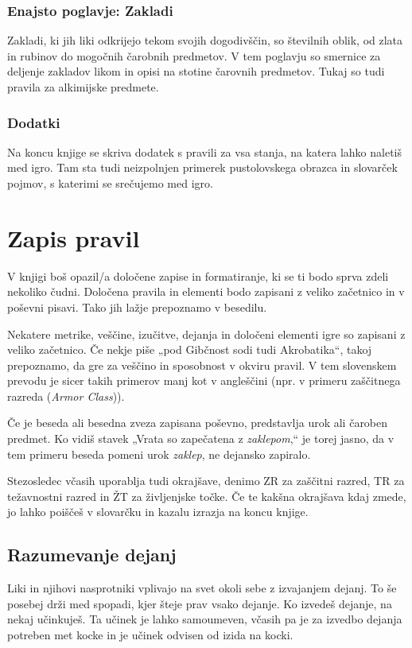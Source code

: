 \subsubsection{Enajsto poglavje: Zakladi}
Zakladi, ki jih liki odkrijejo tekom svojih dogodivščin, so številnih oblik, od zlata in rubinov do mogočnih čarobnih predmetov. V tem poglavju so smernice za deljenje zakladov likom in opisi na stotine čarovnih predmetov. Tukaj so tudi pravila za alkimijske predmete.

\subsubsection{Dodatki}
Na koncu knjige se skriva dodatek s pravili za vsa stanja, na katera lahko naletiš med igro. Tam sta tudi neizpolnjen primerek pustolovskega obrazca in slovarček pojmov, s katerimi se srečujemo med igro.

\section{Zapis pravil}
V knjigi boš opazil/a določene zapise in formatiranje, ki se ti bodo sprva zdeli nekoliko čudni. Določena pravila in elementi bodo zapisani z veliko začetnico in v poševni pisavi. Tako jih lažje prepoznamo v besedilu.

Nekatere metrike, veščine, izučitve, dejanja in določeni elementi igre so zapisani z veliko začetnico. Če nekje piše „pod Gibčnost sodi tudi Akrobatika“, takoj prepoznamo, da gre za veščino in sposobnost v okviru pravil. V tem slovenskem prevodu je sicer takih primerov manj kot v angleščini (npr. v primeru zaščitnega razreda (\textit{Armor Class})).

Če je beseda ali besedna zveza zapisana poševno, predstavlja urok ali čaroben predmet. Ko vidiš stavek „Vrata so zapečatena z \textit{zaklepom},“ je torej jasno, da v tem primeru beseda pomeni urok \textit{zaklep}, ne dejansko zapiralo.

Stezosledec včasih uporablja tudi okrajšave, denimo ZR za zaščitni razred, TR za težavnostni razred in ŽT za življenjske točke. Če te kakšna okrajšava kdaj zmede, jo lahko poiščeš v slovarčku in kazalu izrazja na koncu knjige.

\subsection{Razumevanje dejanj}
Liki in njihovi nasprotniki vplivajo na svet okoli sebe z izvajanjem dejanj. To še posebej drži med spopadi, kjer šteje prav vsako dejanje. Ko izvedeš dejanje, na nekaj učinkuješ. Ta učinek je lahko samoumeven, včasih pa je za izvedbo dejanja potreben met kocke in je učinek odvisen od izida na kocki.

